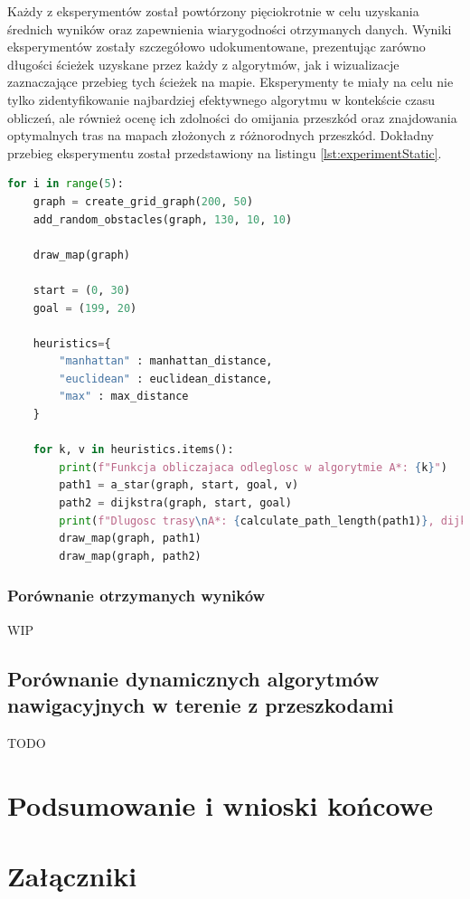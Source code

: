 \documentclass[12pt,twoside]{article}
\begin{document}
Każdy z eksperymentów został powtórzony pięciokrotnie w celu uzyskania średnich wyników oraz zapewnienia wiarygodności otrzymanych danych. Wyniki eksperymentów zostały szczegółowo udokumentowane, prezentując zarówno długości ścieżek uzyskane przez każdy z algorytmów, jak i wizualizacje zaznaczające przebieg tych ścieżek na mapie. Eksperymenty te miały na celu nie tylko zidentyfikowanie najbardziej efektywnego algorytmu w kontekście czasu obliczeń, ale również ocenę ich zdolności do omijania przeszkód oraz znajdowania optymalnych tras na mapach złożonych z różnorodnych przeszkód. Dokładny przebieg eksperymentu został przedstawiony na listingu \ref{lst:experimentStatic}.


\begin{lstlisting}[language=Python, caption={Porównanie algorytmów}, label={lst:experimentStatic}]
for i in range(5):
    graph = create_grid_graph(200, 50)
    add_random_obstacles(graph, 130, 10, 10)

    draw_map(graph)

    start = (0, 30)
    goal = (199, 20)

    heuristics={
        "manhattan" : manhattan_distance,
        "euclidean" : euclidean_distance,
        "max" : max_distance
    }

    for k, v in heuristics.items():
        print(f"Funkcja obliczajaca odleglosc w algorytmie A*: {k}")
        path1 = a_star(graph, start, goal, v)
        path2 = dijkstra(graph, start, goal)
        print(f"Dlugosc trasy\nA*: {calculate_path_length(path1)}, dijkstra: {calculate_path_length(path2)}")
        draw_map(graph, path1)
        draw_map(graph, path2)
\end{lstlisting}

\subsubsection{Porównanie otrzymanych wyników}
WIP
\subsection{Porównanie dynamicznych algorytmów nawigacyjnych w terenie z przeszkodami}
TODO
\section{Podsumowanie i wnioski końcowe}

\section*{Załączniki}
\end{document}
